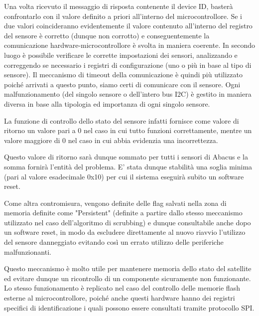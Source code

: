 \documentclass[LaM,binding=0.6cm]{../sapthesis}
\begin{document}
Una volta ricevuto il messaggio di risposta contenente il device ID, basterà confrontarlo con il valore definito a priori all’interno del microcontrollore. Se i due valori coincideranno evidentemente il valore contenuto all’interno del registro del sensore è corretto (dunque non corrotto) e conseguentemente la comunicazione hardware-microcontrollore è svolta in maniera coerente. 
In secondo luogo è possibile verificare le corrette impostazioni dei sensori, analizzando e correggendo se necessario i registri di configurazione (uno o più in base al tipo di sensore). Il meccanismo di timeout della comunicazione è quindi più utilizzato poiché arrivati a questo punto, siamo certi di comunicare con il sensore.
Ogni malfunzionamento (del singolo sensore o dell'intero bus I2C) è gestito in maniera diversa in base alla tipologia ed importanza di ogni singolo sensore.

La funzione di controllo dello stato del sensore infatti fornisce come valore di ritorno un valore pari a 0 nel caso in cui tutto funzioni correttamente, mentre un valore maggiore di 0 nel caso in cui abbia evidenzia una incorrettezza.

Questo valore di ritorno sarà dunque sommato per tutti i sensori di Abacus e la somma fornirà l'entità del problema. E' stata dunque stabilità una soglia minima (pari al valore esadecimale 0x10) per cui il sistema eseguirà subito un software reset.

Come altra contromisura, vengono definite delle flag salvati nella zona di memoria definite come "Persistent" (definite a partire dallo stesso meccanismo utilizzato nel caso dell'algoritmo di scrubbing) e dunque consultabile anche dopo un software reset, in modo da escludere direttamente al nuovo riavvio l'utilizzo del sensore danneggiato evitando così un errato utilizzo delle periferiche malfunzionanti. 

Questo  meccanismo è molto utile per mantenere memoria dello stato del satellite ed evitare dunque un ricontrollo di un componente sicuramente non funzionante.
\newline\newline
Lo stesso funzionamento è replicato nel caso del controllo delle memorie flash esterne al microcontrollore, poiché anche questi hardware hanno dei registri specifici di identificazione i quali possono essere consultati tramite protocollo SPI.
\end{document}
